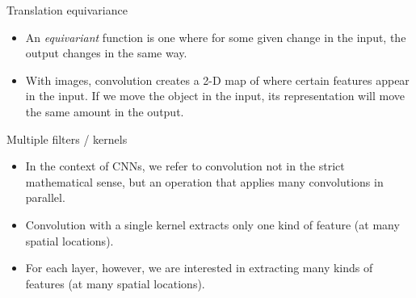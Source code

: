 \documentclass{beamer}
\begin{document}
	\begin{frame}{Translation equivariance}
	\begin{itemize}
		\item An \emph{equivariant} function is one where for some given change in the input, the output changes in the same way.%
		\item With images, convolution creates a 2-D map of where certain features appear in the input. If we move the object in the input, its representation will move the same amount in the output.
	\end{itemize}
	\end{frame}

	\begin{frame}{Multiple filters / kernels}
	\begin{itemize}
		\item In the context of CNNs, we refer to convolution not in the strict mathematical sense, but an operation that applies many convolutions in parallel.
		\item Convolution with a single kernel extracts only one kind of feature (at many spatial locations).
		\item For each layer, however, we are interested in extracting many kinds of features (at many spatial locations). 
	\end{itemize}
	\end{frame}
\end{document}
